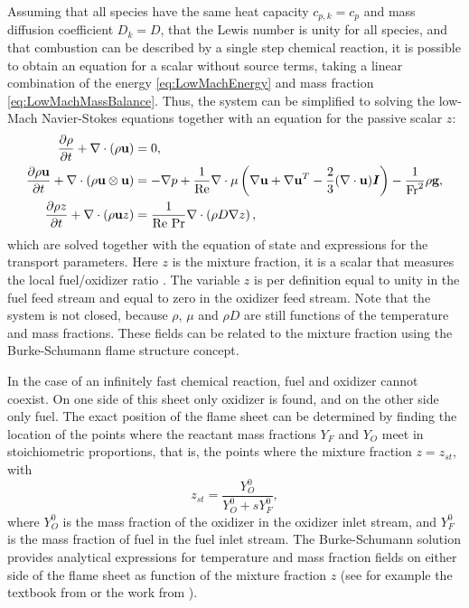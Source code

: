 Assuming that all species have the same heat capacity $c_{p,k} = c_p$ and mass diffusion coefficient $D_k=D$, that the Lewis number is unity for all species, and that combustion can be described by a single step chemical reaction, it is possible to obtain an equation for a scalar without source terms, taking a linear combination of the energy \cref{eq:LowMachEnergy} and mass fraction \cref{eq:LowMachMassBalance}. Thus, the system can be simplified to solving the low-Mach Navier-Stokes equations together with an equation for the passive scalar $z$:
\begin{subequations}
	\begin{align}
		\frac{\partial \rho}{\partial t}+	\nabla \cdot (\rho \textbf{u})                          & = 0, \label{eq:MixtFracConti2}                                                                                                                                                                    \\
		\frac{\partial \rho \textbf{u}}{\partial t} +	\nabla \cdot (\rho \textbf{u} \otimes \textbf{u}) & = - \nabla p + \frac{1}{\text{Re}}\nabla \cdot \mu\left( \nabla \textbf{u} +\nabla \textbf{u}^T  - \frac{2}{3}(\nabla\cdot \textbf{u})\boldsymbol I \right)  - \frac{1}{\text{Fr}^2}\rho\textbf{g},\label{eq:MixtFracMom} \\
		\frac{\partial \rho z}{\partial t}+	\nabla \cdot (\rho \textbf{u}z)                       & = \frac{1}{\text{Re Pr}}\nabla \cdot\left(\rho D \nabla z\right), \label{eq:MixtFracMF}
	\end{align}
	\label{eq:all-eq-mixfrac}
\end{subequations}
which are solved together with the equation of state and expressions for the transport parameters. Here $z$ is the mixture fraction, it is a scalar that measures the local fuel/oxidizer ratio \citep{poinsotTheoreticalNumericalCombustion2005}. The variable $z$ is per definition equal to unity in the fuel feed stream and equal to zero in the oxidizer feed stream. Note that the system is not closed, because $\rho$, $\mu$ and $\rho D$ are still functions of the temperature and mass fractions. These fields can be related to the mixture fraction using the Burke-Schumann flame structure concept. \citep{burkeDiffusionFlames1928} 

In the case of an infinitely fast chemical reaction, fuel and oxidizer cannot coexist. On one side of this sheet only oxidizer is found, and on the other side only fuel. The exact position of the flame sheet can be determined by finding the location of the points where the reactant mass fractions $Y_F$ and $Y_O$  meet in stoichiometric proportions, that is, the points where the mixture fraction $z = z_{st}$, with
\begin{equation}
	z_{st} = \frac{Y_O^0}{Y_O^0+sY_F^0},
\end{equation}
where $Y_O^0$ is the mass fraction of the oxidizer in the oxidizer inlet stream, and $Y_F^0$ is the mass fraction of fuel in the fuel inlet stream.
The Burke-Schumann solution provides analytical expressions for temperature and mass fraction fields on either side of the flame sheet as function of the mixture fraction $z$ (see for example the textbook from \cite{poinsotTheoreticalNumericalCombustion2005} or the work from \cite{keyesFlameSheetStarting1987}).


